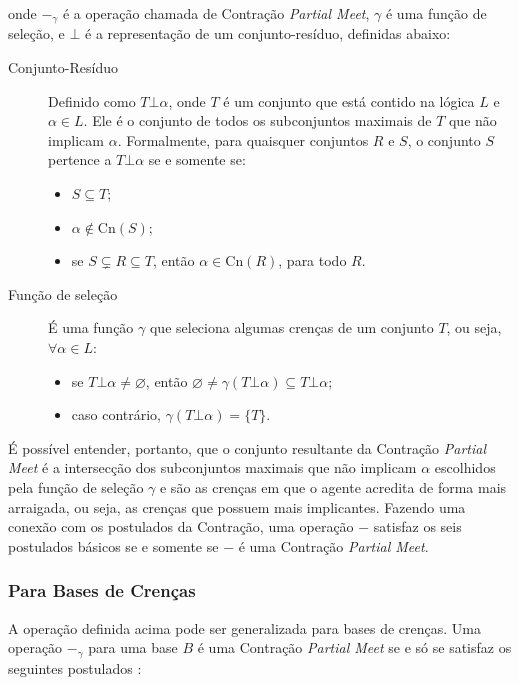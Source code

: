 onde $ -_{\gamma} $ é a operação chamada de Contração \textit{Partial Meet}, $ \gamma $ é uma função de seleção, e $ \bot $ é a representação de um conjunto-resíduo, definidas abaixo:

\begin{description}
	\item[Conjunto-Resíduo] Definido como $ T \bot \alpha $, onde $ T $ é um conjunto que está contido na lógica $ L $ e $ \alpha \in L $. Ele é o conjunto de todos os subconjuntos maximais de $ T $ que não implicam $ \alpha $. Formalmente, para quaisquer conjuntos $ R $ e $ S $, o conjunto $ S $ pertence a $ T \bot \alpha $ se e somente se:
	\begin{itemize}
		\item $ S \subseteq T $;
		\item $ \alpha \notin \text{Cn}(S) $;
		\item se $ S \subsetneq R \subseteq T $, então $ \alpha \in \text{Cn}(R)$, para todo $R$.
	\end{itemize}
	\item[Função de seleção] É uma função $ \gamma $ que seleciona algumas crenças de um conjunto $ T $, ou seja, $ \forall \alpha \in L $:
	\begin{itemize}
		\item se $ T \bot \alpha \neq \varnothing $, então $ \varnothing \neq \gamma(T \bot \alpha) \subseteq T \bot \alpha $;
		\item caso contrário, $ \gamma(T \bot \alpha) = \{T\} $.
	\end{itemize}
\end{description}

É possível entender, portanto, que o conjunto resultante da Contração \textit{Partial Meet} é a intersecção dos subconjuntos maximais que não implicam $ \alpha $ escolhidos pela função de seleção $ \gamma $ e são as crenças em que o agente acredita de forma mais arraigada, ou seja, as crenças que possuem mais implicantes. Fazendo uma conexão com os postulados da Con\-tra\-ção, uma operação $ - $ satisfaz os seis postulados básicos se e somente se $ - $ é uma Contração \textit{Partial Meet}.

\subsubsection{Para Bases de Crenças}

A operação definida acima pode ser generalizada para bases de crenças. Uma operação $ -_{\gamma} $ para uma base $ B $ é uma Contração \textit{Partial Meet} se e só se satisfaz os seguintes postulados \citep{revisaoHansson2}:


